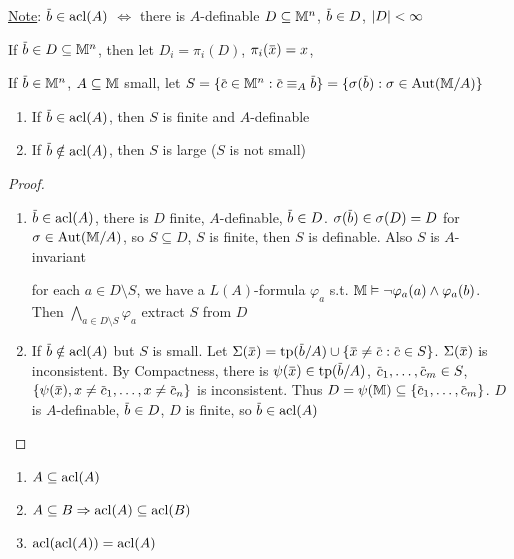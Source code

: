 \documentclass[11pt]{article}
\begin{document}
\uline{Note}: \(\barb\in\acl(A)\) \(\Leftrightarrow\) there is \(A\)-definable \(D\subseteq\mathbb{M}^n\), \(\barb\in D\), \(\abs{D}<\infty\)

If \(\barb\in D\subseteq\M^n\), then let \(D_i=\pi_i(D)\), \(\pi_i(\barx)=x\),

\begin{proposition}[]
\label{4.7.14}
If \(\barb\in\M^n\), \(A\subseteq\mathbb{M}\) small, let \(S=\{\barc\in\M^n:\barc\equiv_A\barb\}=\{\sigma(\barb):\sigma\in\Aut(\M/A)\}\)
\begin{enumerate}
\item If \(\barb\in\acl(A)\), then \(S\) is finite and \(A\)-definable
\item If \(\barb\notin\acl(A)\), then \(S\) is large (\(S\) is not small)
\end{enumerate}
\end{proposition}

\begin{proof}
\begin{enumerate}
\item \(\barb\in\acl(A)\), there is \(D\) finite, \(A\)-definable, \(\barb\in D\). \(\sigma(\barb)\in\sigma(D)=D\)
for \(\sigma\in\operatorname{\text{Aut}}(\mathbb{M}/A)\), so \(S\subseteq D\), \(S\) is finite, then \(S\) is definable. Also \(S\)
is \(A\)-invariant

for each \(a\in D\setminus S\), we have a \(L(A)\)-formula \(\varphi_a\) s.t. \(\mathbb{M}\vDash\neg\varphi_a(a)\wedge\varphi_a(b)\).
Then \(\bigwedge_{a\in D\setminus S}\varphi_a\) extract \(S\) from \(D\)
\item If \(\barb\notin\acl(A)\) but \(S\) is small.
Let \(\Sigma(\barx)=\tp(\barb/A)\cup\{\barx\neq\barc:\barc\in S\}\). \(\Sigma(\barx)\) is inconsistent. By
Compactness, there
is \(\psi(\barx)\in\tp(\barb/A)\), \(\barc_1,\dots,\barc_m\in S\), \(\{\psi(\barx),x\neq\barc_1,\dots,x\neq\barc_n\}\) is
inconsistent. Thus \(D=\psi(\M)\subseteq\{\barc_1,\dots,\barc_m\}\). \(D\)
is \(A\)-definable, \(\barb\in D\), \(D\) is finite, so \(\barb\in\acl(A)\)
\end{enumerate}
\end{proof}

\begin{proposition}[]
\begin{enumerate}
\item \(A\subseteq\operatorname{acl}(A)\)
\item \(A\subseteq B\Rightarrow\operatorname{acl}(A)\subseteq\operatorname{acl}(B)\)
\item \(\operatorname{acl}(\operatorname{acl}(A))=\operatorname{acl}(A)\)
\end{enumerate}
\end{proposition}
\end{document}
